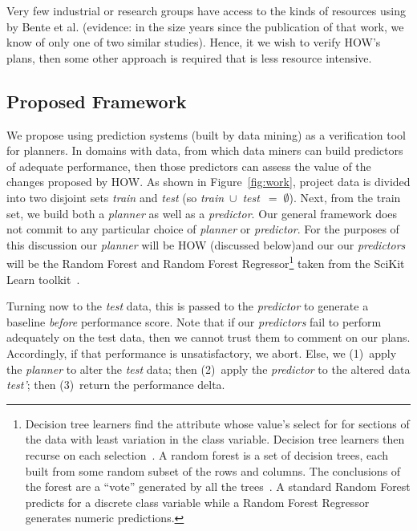 \documentclass[conference]{IEEEtran}
\newcommand{\fig}[1]{Figure~\ref{fig:#1}}
\begin{document}
Very few industrial or research groups have access
to the kinds of resources using by Bente et al. (evidence: in the size years since the
publication of that work, we know of only one of two similar studies). Hence, it
we wish to verify HOW's plans, then some other approach is required that is less
resource intensive.

\subsection{Proposed Framework}

We propose using prediction systems (built by data mining) as a verification
tool for planners. In domains with data, from which data miners can build
predictors of adequate performance, then those predictors can assess the value
of the changes proposed by HOW.
As shown in \fig{work}, 
project data is divided into two disjoint sets {\em train} and {\em test}
(so \mbox{{\em train} $\cup$ {\em test} $=\;\emptyset$}).
Next, from the train set, we build both a {\em planner} as well
as a {\em predictor}. Our general framework does not   commit to any particular  choice
of {\em planner} or {\em predictor}. For the purposes of this discussion 
our {\em planner}
will be HOW (discussed below)and our
our {\em predictors} will be the Random Forest and Random Forest
Regressor\footnote{Decision tree learners find the attribute whose value's
select for for sections of the data with least variation in the class
variable. Decision tree learners then recurse on each selection~\cite{breiman84}. A random forest is a set of decision trees, each built
from some random subset of the rows and columns. The conclusions
of the forest are a ``vote'' generated by all the trees~\cite{Breiman2001}. 
A standard Random Forest predicts for a discrete class variable while
a Random Forest Regressor generates numeric predictions.} taken from the SciKit
Learn toolkit~\cite{Pedregosa2012}.

Turning now to the {\em test} data, this is passed to the {\em predictor}
to generate a baseline {\em before} performance score.
Note that if our {\em predictors} fail to perform adequately on the test data,
then we cannot trust them to comment on our plans. Accordingly,
if that performance is unsatisfactory, we abort.
Else, we (1)~apply the {\em planner} to alter the {\em test} data;
then (2)~apply the {\em predictor} to the altered data {\em test'};
then (3)~return the performance delta.
\end{document}
